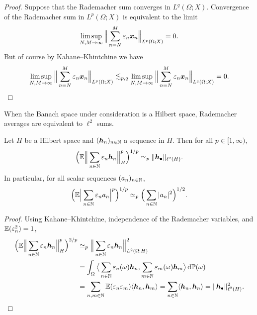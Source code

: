 \begin{proof}
  Suppose that the Rademacher sum converges in $L^q(\Omega;X)$.
  Convergence of the Rademacher sum in $L^p(\Omega;X)$ is equivalent to the limit
  \begin{equation*}
    \limsup_{N,M \to \infty} \Big\| \sum_{n=N}^{M} \varepsilon_{n} \bm{x}_{n} \Big\|_{L^p(\Omega;X)} = 0.
  \end{equation*}
  But of course by Kahane--Khintchine we have
  \begin{equation*}
    \limsup_{N,M \to \infty} \Big\| \sum_{n=N}^{M} \varepsilon_{n} \bm{x}_{n} \Big\|_{L^p(\Omega;X)}
    \lesssim_{p,q} \limsup_{N,M \to \infty} \Big\| \sum_{n=N}^{M} \varepsilon_{n} \bm{x}_{n} \Big\|_{L^q(\Omega;X)} = 0.
  \end{equation*}
\end{proof}

When the Banach space under consideration is a Hilbert space, Rademacher averages are equivalent to $\ell^2$ sums.

\begin{thm}\label{thm:khintchine}
  Let $H$ be a Hilbert space and $(\bm{h}_{n})_{n \in \mathbb{N}}$ a sequence in $H$.
  Then for all $p \in [1,\infty)$,
  \begin{equation*}
    \Big(\mathbb{E} \Big\| \sum_{n \in \mathbb{N}} \varepsilon_{n} \bm{h}_{n} \Big\|_{H}^{p} \Big)^{1/p} \simeq_{p} \|\bm{h}_{\bullet}\|_{\ell^2(H)}.
  \end{equation*}
  In particular, for all scalar sequences $(a_{n})_{n \in \mathbb{N}}$,
  \begin{equation*}
    \Big( \mathbb{E} \Big| \sum_{n \in \mathbb{N}} \varepsilon_{n} a_{n} \Big|^{p} \Big)^{1/p}
    \simeq_{p} \Big( \sum_{n \in \mathbb{N}} |a_{n}|^{2} \Big)^{1/2}.
  \end{equation*}
\end{thm}

\begin{proof}
  Using Kahane--Khintchine, independence of the Rademacher variables, and $\mathbb{E}(\varepsilon_{n}^{2}) = 1$,
  \begin{equation*}
    \begin{aligned}
      \Big( \mathbb{E} \Big\| \sum_{n \in \mathbb{N}} \varepsilon_{n} \bm{h}_{n} \Big\|_{H}^{p} \Big)^{2/p}
      &\simeq_{p} \Big\| \sum_{n \in \mathbb{N}} \varepsilon_{n} \bm{h}_{n} \Big\|_{L^2(\Omega;H)}^{2} \\
      &=  \int_{\Omega} \big\langle \sum_{n \in \mathbb{N}} \varepsilon_{n}(\omega) \bm{h}_{n}, \sum_{m \in \mathbb{N}} \varepsilon_{m}(\omega) \bm{h}_{m} \big\rangle \, \mathrm{d} \mathbb{P}(\omega) \\
      & =  \sum_{n,m \in \mathbb{N}} \mathbb{E}(\varepsilon_n \varepsilon_m) \langle \bm{h}_{n}, \bm{h}_{m} \rangle 
      =  \sum_{n \in \mathbb{N}} \langle \bm{h}_{n}, \bm{h}_{n} \rangle  = \|\bm{h}_{\bullet}\|_{\ell^2(H)}^{2}.
    \end{aligned}
  \end{equation*}
\end{proof}

